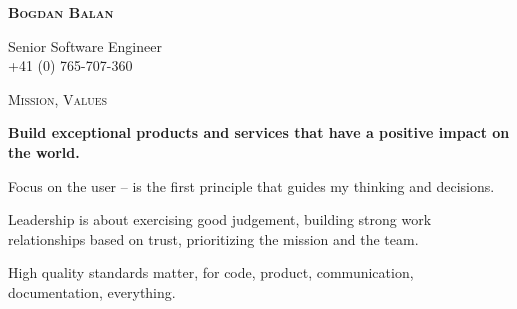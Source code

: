 \documentclass[10pt]{article}
\begin{document}
\noindent
\textcolor{Primary}{\textbf {\huge {\textsc{Bogdan Balan}}}}

\vspace{0.16in}
\noindent
Senior Software Engineer \\
+41 (0) 765-707-360 \\

\vspace{0.32in}
\noindent
\textcolor{Primary}{{\large \textsc{Mission, Values}}}

\begin{list}{}{\leftmargin=0em}
  \setlength{\itemsep}{1pt}
  \setlength{\parskip}{0pt}
  \setlength{\parsep}{0pt}

\item
{\bf Build exceptional products and services that have a positive impact on the world.}
\item
Focus on the user -- is the first principle that guides my thinking and decisions.
\item
Leadership is about exercising good judgement, building strong work relationships based on trust, prioritizing the mission and the team.
\item
High quality standards matter, for code, product, communication, documentation, everything.

\end{list}
\end{document}
